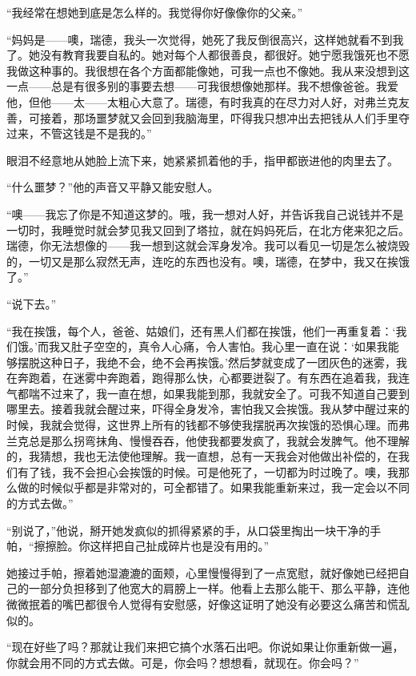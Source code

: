 \par “我经常在想她到底是怎么样的。我觉得你好像像你的父亲。”
\par “妈妈是——噢，瑞德，我头一次觉得，她死了我反倒很高兴，这样她就看不到我了。她没有教育我要自私的。她对每个人都很善良，都很好。她宁愿我饿死也不愿我做这种事的。我很想在各个方面都能像她，可我一点也不像她。我从来没想到这一点——总是有很多别的事要去想——可我很想像她那样。我不想像爸爸。我爱他，但他——太——太粗心大意了。瑞德，有时我真的在尽力对人好，对弗兰克友善，可接着，那场噩梦就又会回到我脑海里，吓得我只想冲出去把钱从人们手里夺过来，不管这钱是不是我的。”
\par 眼泪不经意地从她脸上流下来，她紧紧抓着他的手，指甲都嵌进他的肉里去了。
\par “什么噩梦？”他的声音又平静又能安慰人。
\par “噢——我忘了你是不知道这梦的。哦，我一想对人好，并告诉我自己说钱并不是一切时，我睡觉时就会梦见我又回到了塔拉，就在妈妈死后，在北方佬来犯之后。瑞德，你无法想像的——我一想到这就会浑身发冷。我可以看见一切是怎么被烧毁的，一切又是那么寂然无声，连吃的东西也没有。噢，瑞德，在梦中，我又在挨饿了。”
\par “说下去。”
\par “我在挨饿，每个人，爸爸、姑娘们，还有黑人们都在挨饿，他们一再重复着：‘我们饿。’而我又肚子空空的，真令人心痛，令人害怕。我心里一直在说：‘如果我能够摆脱这种日子，我绝不会，绝不会再挨饿。’然后梦就变成了一团灰色的迷雾，我在奔跑着，在迷雾中奔跑着，跑得那么快，心都要迸裂了。有东西在追着我，我连气都喘不过来了，我一直在想，如果我能到那，我就安全了。可我不知道自己要到哪里去。接着我就会醒过来，吓得全身发冷，害怕我又会挨饿。我从梦中醒过来的时候，我就会觉得，这世界上所有的钱都不够使我摆脱再次挨饿的恐惧心理。而弗兰克总是那么拐弯抹角、慢慢吞吞，他使我都要发疯了，我就会发脾气。他不理解的，我猜想，我也无法使他理解。我一直想，总有一天我会对他做出补偿的，在我们有了钱，我不会担心会挨饿的时候。可是他死了，一切都为时过晚了。噢，我那么做的时候似乎都是非常对的，可全都错了。如果我能重新来过，我一定会以不同的方式去做。”
\par “别说了，”他说，掰开她发疯似的抓得紧紧的手，从口袋里掏出一块干净的手帕，“擦擦脸。你这样把自己扯成碎片也是没有用的。”
\par 她接过手帕，擦着她湿漉漉的面颊，心里慢慢得到了一点宽慰，就好像她已经把自己的一部分负担移到了他宽大的肩膀上一样。他看上去那么能干、那么平静，连他微微抿着的嘴巴都很令人觉得有安慰感，好像这证明了她没有必要这么痛苦和慌乱似的。
\par “现在好些了吗？那就让我们来把它搞个水落石出吧。你说如果让你重新做一遍，你就会用不同的方式去做。可是，你会吗？想想看，就现在。你会吗？”
